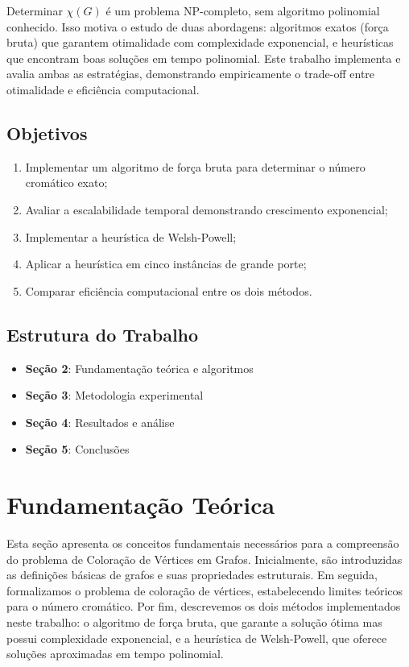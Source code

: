 \documentclass[12pt]{article}
\begin{document}
Determinar $\chi(G)$ é um problema NP-completo, sem algoritmo polinomial conhecido. Isso motiva o estudo de duas abordagens: algoritmos exatos (força bruta) que garantem otimalidade com complexidade exponencial, e heurísticas que encontram boas soluções em tempo polinomial. Este trabalho implementa e avalia ambas as estratégias, demonstrando empiricamente o trade-off entre otimalidade e eficiência computacional.

\subsection{Objetivos}

\begin{enumerate}
    \item Implementar um algoritmo de força bruta para determinar o número cromático exato;
    \item Avaliar a escalabilidade temporal demonstrando crescimento exponencial;
    \item Implementar a heurística de Welsh-Powell;
    \item Aplicar a heurística em cinco instâncias de grande porte;
    \item Comparar eficiência computacional entre os dois métodos.
\end{enumerate}

\subsection{Estrutura do Trabalho}

\begin{itemize}
    \item \textbf{Seção 2}: Fundamentação teórica e algoritmos
    \item \textbf{Seção 3}: Metodologia experimental
    \item \textbf{Seção 4}: Resultados e análise
    \item \textbf{Seção 5}: Conclusões
\end{itemize}

\newpage
\section{Fundamentação Teórica}

Esta seção apresenta os conceitos fundamentais necessários para a compreensão do problema de Coloração de Vértices em Grafos. Inicialmente, são introduzidas as definições básicas de grafos e suas propriedades estruturais. Em seguida, formalizamos o problema de coloração de vértices, estabelecendo limites teóricos para o número cromático. Por fim, descrevemos os dois métodos implementados neste trabalho: o algoritmo de força bruta, que garante a solução ótima mas possui complexidade exponencial, e a heurística de Welsh-Powell, que oferece soluções aproximadas em tempo polinomial.
\end{document}
